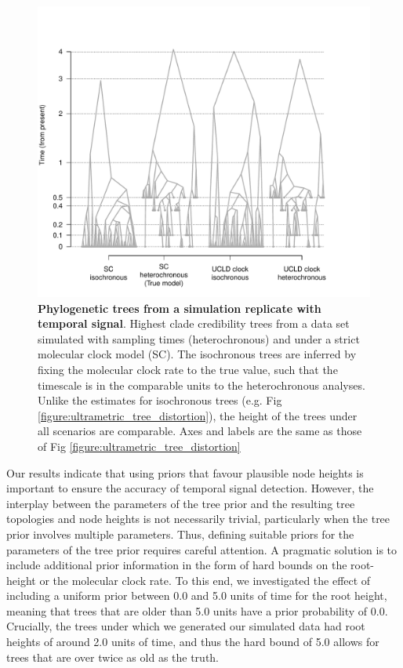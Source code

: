 \documentclass[10pt,letterpaper]{article}
\begin{document}
\begin{figure}[!h]
	\begin{center}
		\includegraphics[width=15cm]{sandbox_figures/tree_distortion_heterochronous.pdf}\newline
		\vspace{-0.5cm}
		\caption{\textbf{Phylogenetic trees from a simulation replicate with temporal signal}. Highest clade credibility trees from a data set simulated with sampling times (heterochronous) and under a strict molecular clock model (SC). The isochronous trees are inferred by fixing the molecular clock rate to the true value, such that the timescale is in the comparable units to the heterochronous analyses. Unlike the estimates for isochronous trees (e.g. Fig \ref{figure:ultrametric_tree_distortion}), the height of the trees  under all scenarios are comparable. Axes and labels are the same as those of Fig \ref{figure:ultrametric_tree_distortion}}
		\label{figure:heterochronous_tree_distortion}
	\end{center}
\end{figure}

Our results indicate that using priors that favour plausible node heights is important to ensure the accuracy of temporal signal detection. However, the interplay between the parameters of the tree prior and the resulting tree topologies and node heights is not necessarily trivial, particularly when the tree prior involves multiple parameters. Thus, defining suitable priors for the parameters of the tree prior requires careful attention. A pragmatic solution is to include additional prior information in the form of hard bounds on the root-height or the molecular clock rate. To this end, we investigated the effect of including a uniform prior between 0.0 and 5.0 units of time for the root height, meaning that trees that are older than 5.0 units have a prior probability of 0.0. Crucially, the trees under which we generated our simulated data had root heights of around 2.0 units of time, and thus the hard bound of 5.0 allows for trees that are over twice as old as the truth. 
\end{document}
